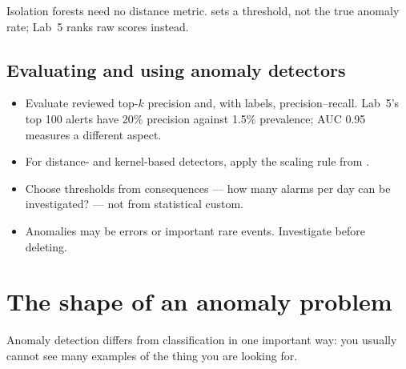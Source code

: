 Isolation forests need no distance metric.  sets a threshold, not the true anomaly rate; Lab~5 ranks raw scores instead.

\subsection{Evaluating and using anomaly detectors}

\begin{itemize}
  \item Evaluate reviewed top-$k$ precision and, with labels, precision--recall. Lab~5's top 100 alerts have 20\% precision against 1.5\% prevalence; AUC 0.95 measures a different aspect.
  \item For distance- and kernel-based detectors, apply the scaling rule from .
  \item Choose thresholds from consequences --- how many alarms per day can be investigated? --- not from statistical custom.
  \item Anomalies may be errors or important rare events. Investigate before deleting.
\end{itemize}

\section{The shape of an anomaly problem}

Anomaly detection differs from classification in one important way: you usually cannot see many examples of the thing you are looking for.

